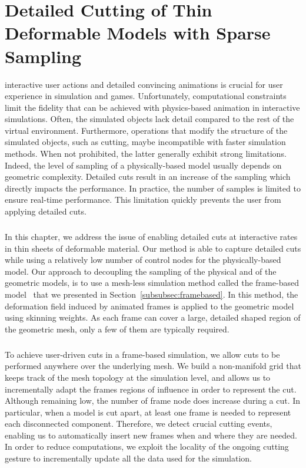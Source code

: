 \chapter[Detailed Cutting with Sparse Sampling]{Detailed Cutting of Thin Deformable Models with Sparse Sampling}
\label{chap:cutting}
 interactive user actions and detailed convincing animations is crucial for user experience in simulation and games. Unfortunately, computational constraints limit the 
fidelity that can be achieved with physics-based animation
in interactive simulations. Often, the simulated objects lack detail compared to the rest of the virtual environment.
Furthermore, operations that modify the structure of the simulated objects, such as cutting, 
maybe incompatible with faster simulation methods.
When not prohibited, the latter generally exhibit strong limitations. Indeed, the level of sampling of a physically-based model usually depends on geometric complexity. Detailed cuts result in an increase of the sampling which directly impacts the performance. In practice, the number of samples is limited to ensure real-time performance. This limitation quickly prevents the user from applying detailed cuts.  
\paragraph*{}
In this chapter, we address the issue of enabling detailed cuts at interactive rates in  thin sheets of deformable material.
 Our method is able to capture detailed cuts while using a relatively low number of control nodes for the physically-based model.
Our approach to decoupling the sampling of the physical and of the geometric models, is to use a mesh-less simulation method called the frame-based model~\cite{Gilles2011} that we presented in Section~\ref{subsubsec:framebased}. In this method, the deformation field induced by animated frames is applied to the geometric model using skinning weights. As each frame can cover a large, detailed shaped region of the geometric mesh, only a few of them are typically required.
\paragraph*{}
To achieve user-driven cuts in a frame-based simulation, we allow cuts to be performed anywhere over the underlying mesh.
We build a non-manifold grid that keeps track of the mesh topology at the simulation level, and allows us to incrementally adapt the frames regions of influence in order to  represent the cut.
Although remaining low, the number of frame node does increase during a cut. 
In particular, when a model is cut apart, at least one frame is needed to represent each disconnected component. 
Therefore, we detect crucial cutting events, enabling us to automatically insert new frames when and where they are needed.
In order to reduce computations, we exploit the locality of the ongoing cutting gesture to incrementally update all the data used for the simulation.
